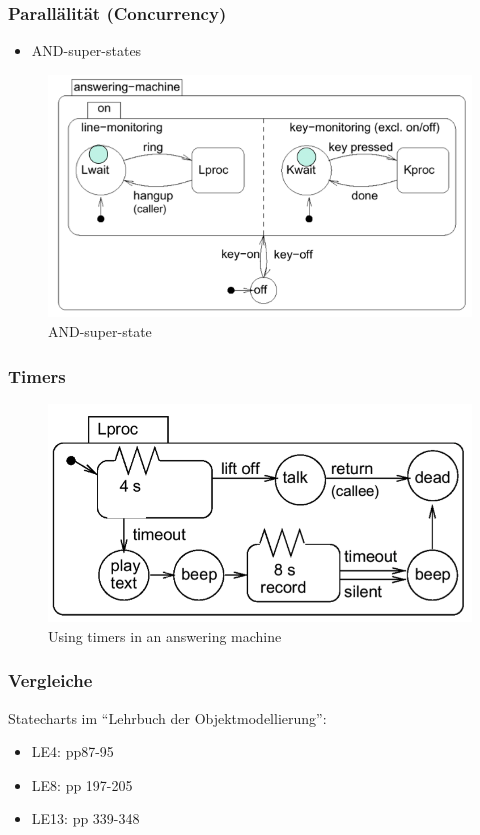 \subsubsection{Parallälität (Concurrency)}
\begin{itemize}
  \item AND-super-states
\end{itemize}
\begin{figure}[h]
  \centering
  {\includegraphics[scale = 0.4]{images/FSM/AND_super_state}  
  \caption{AND-super-state}
  \label{fig:AND_super_state}}
\end{figure} 

\subsubsection{Timers}
\begin{figure}[h]
  \centering
  {\includegraphics[scale = 0.2]{images/FSM/timer}  
  \caption{Using timers in an  answering machine}
  \label{fig:timer}}
\end{figure} 

\subsubsection{Vergleiche }
Statecharts im "`Lehrbuch der Objektmodellierung"':
\begin{itemize}
  \item LE4: pp87-95
  \item LE8: pp 197-205
  \item LE13: pp 339-348
\end{itemize}
\newpage
